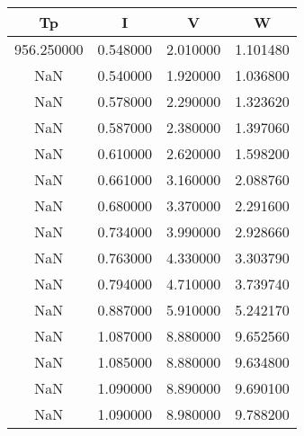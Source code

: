 \begin{tabular}{cccc}
\toprule
Tp & I & V & W \\
\midrule
956.250000 & 0.548000 & 2.010000 & 1.101480 \\
NaN & 0.540000 & 1.920000 & 1.036800 \\
NaN & 0.578000 & 2.290000 & 1.323620 \\
NaN & 0.587000 & 2.380000 & 1.397060 \\
NaN & 0.610000 & 2.620000 & 1.598200 \\
NaN & 0.661000 & 3.160000 & 2.088760 \\
NaN & 0.680000 & 3.370000 & 2.291600 \\
NaN & 0.734000 & 3.990000 & 2.928660 \\
NaN & 0.763000 & 4.330000 & 3.303790 \\
NaN & 0.794000 & 4.710000 & 3.739740 \\
NaN & 0.887000 & 5.910000 & 5.242170 \\
NaN & 1.087000 & 8.880000 & 9.652560 \\
NaN & 1.085000 & 8.880000 & 9.634800 \\
NaN & 1.090000 & 8.890000 & 9.690100 \\
NaN & 1.090000 & 8.980000 & 9.788200 \\
\bottomrule
\end{tabular}
